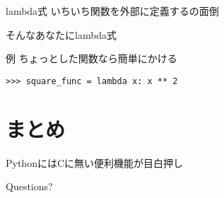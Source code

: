 \documentclass[12pt, xetex, xcolor=pdftex, dvipsnames]{beamer}
\begin{document}
\begin{frame}{lambda式}
    いちいち関数を外部に定義するの面倒

    そんなあなたにlambda式
\end{frame}
\begin{frame}[fragile]{例}
ちょっとした関数なら簡単にかける

\begin{lstlisting}
>>> square_func = lambda x: x ** 2
\end{lstlisting}

\end{frame}

\section{まとめ}
\begin{frame}
    PythonにはCに無い便利機能が目白押し
\end{frame}
\begin{frame}[standout]
  Questions?
\end{frame}
\end{document}
